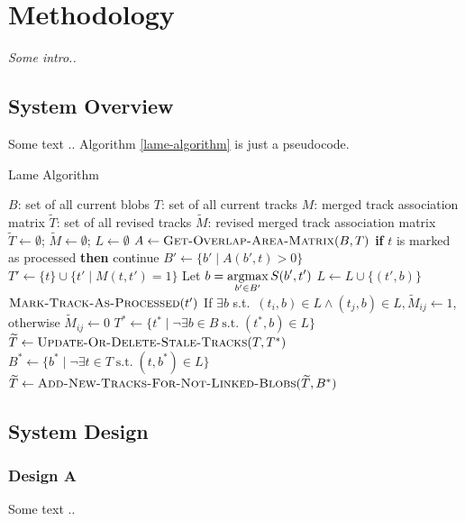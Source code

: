 \setlength{\footskip}{8mm}

\chapter{Methodology}
\label{ch:methodology}

\textit{Some intro..}

\section{System Overview}

Some text .. Algorithm \ref{lame-algorithm} is just a pseudocode.

\renewcommand{\algorithmicrequire}{\textbf{Input:}}
\renewcommand{\algorithmicensure}{\textbf{Output:}}
\renewcommand{\algorithmicforall}{\textbf{for each}}
\begin{algorithm}
\caption{Lame Algorithm}
\label{lame-algorithm}
\begin{algorithmic}
  \REQUIRE $B$: set of all current blobs
  \REQUIRE $T$: set of all current tracks
  \REQUIRE $M$: merged track association matrix
  \ENSURE $\widetilde{T}$: set of all revised tracks
  \ENSURE $\widetilde{M}$: revised merged track association matrix
  \STATE $\widetilde{T} \gets \emptyset$; $\widetilde{M} \gets \emptyset$; $L \gets \emptyset$
  \STATE $A \gets \textsc{Get-Overlap-Area-Matrix}(B, T)$
    \STATE \textbf{if} $t$ is marked as processed \textbf{then} continue
    \STATE $B' \gets \{ b' \mid A(b', t) > 0 \}$ 
    \STATE $T' \gets \{ t \} \cup \{ t' \mid M(t, t') = 1 \}$ 
        \STATE Let $b = \displaystyle\operatorname*{argmax}_{b' \in B'} S(b', t')$
        \STATE $L \gets L \cup \{ (t', b) \}$
        \STATE $\textsc{Mark-Track-As-Processed}(t')$
      \ENDFOR
    \ENDIF
  \ENDFOR
    \STATE If $\exists b$ s.t.\ $(t_i, b) \in L \wedge (t_j, b) \in L, \widetilde{M}_{ij} \gets 1$, otherwise $\widetilde{M}_{ij} \gets 0$
  \ENDFOR
  \STATE $T^* \gets \{ t^* \mid \neg\exists b \in B \;\text{s.t.}\; (t^*,b) \in L \}$ 
  \STATE $\widetilde{T} \gets \textsc{Update-Or-Delete-Stale-Tracks}(T,T^*)$
  \STATE $B^* \gets \{ b^* \mid \neg \exists t \in T \;\text{s.t.}\; (t, b^*) \in L \}$ 
  \STATE $\widetilde{T} \gets\textsc{Add-New-Tracks-For-Not-Linked-Blobs}(\widetilde{T},B^*)$
\end{algorithmic}
\end{algorithm}

\section{System Design}

\subsection{Design A}

Some text ..

\FloatBarrier
